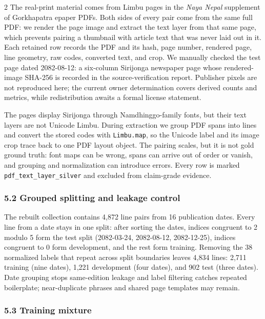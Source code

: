 \documentclass[
  10pt,
]{article}
\begin{document}
\begin{multicols}{2}
The real-print material comes from Limbu pages in the \emph{Naya Nepal}
supplement of Gorkhapatra epaper PDFs. Both sides of every pair come
from the same full PDF: we render the page image and extract the text
layer from that same page, which prevents pairing a thumbnail with
article text that was never laid out in it. Each retained row records
the PDF and its hash, page number, rendered page, line geometry, raw
codes, converted text, and crop. We manually checked the test page dated
2082-08-12: a six-column Sirijonga newspaper page whose rendered-image
SHA-256 is recorded in the source-verification report. Publisher pixels
are not reproduced here; the current owner determination covers derived
counts and metrics, while redistribution awaits a formal license
statement.

The pages display Sirijonga through Namdhinggo-family fonts, but their
text layers are not Unicode Limbu. During extraction we group PDF spans
into lines and convert the stored codes with \texttt{Limbu.map}, so the
Unicode label and its image crop trace back to one PDF layout object.
The pairing scales, but it is not gold ground truth: font maps can be
wrong, spans can arrive out of order or vanish, and grouping and
normalization can introduce errors. Every row is marked
\texttt{pdf\_text\_layer\_silver} and excluded from claim-grade
evidence.

\subsubsection{5.2 Grouped splitting and leakage
control}\label{grouped-splitting-and-leakage-control}

The rebuilt collection contains 4,872 line pairs from 16 publication
dates. Every line from a date stays in one split: after sorting the
dates, indices congruent to 2 modulo 5 form the test split (2082-03-24,
2082-08-12, 2082-12-25), indices congruent to 0 form development, and
the rest form training. Removing the 38 normalized labels that repeat
across split boundaries leaves 4,834 lines: 2,711 training (nine dates),
1,221 development (four dates), and 902 test (three dates). Date
grouping stops same-edition leakage and label filtering catches repeated
boilerplate; near-duplicate phrases and shared page templates may
remain.

\subsubsection{5.3 Training mixture}\label{training-mixture}


\end{multicols}
\end{document}
